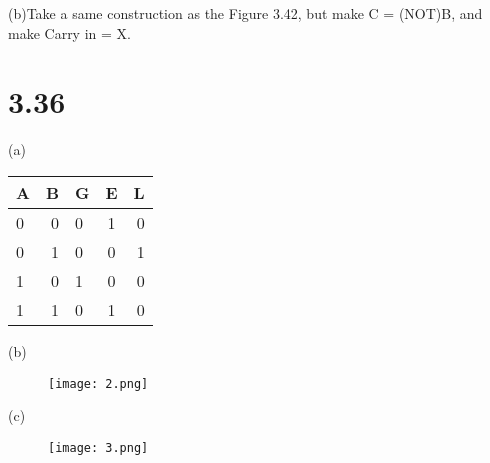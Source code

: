 \documentclass[20pt]{ctexart}
\begin{document}
(b)Take a same construction as the Figure 3.42, but make C = (NOT)B, and make Carry in = X.

\section*{3.36}
(a)\begin{table}[H]
    \centering
    \begin{tabular}{lr|lcr}
    \hline
    A & B & G & E & L \\
    \hline
    0 & 0 & 0 & 1 & 0 \\
    0 & 1 & 0 & 0 & 1 \\
    1 & 0 & 1 & 0 & 0 \\
    1 & 1 & 0 & 1 & 0 \\
    \hline
    \end{tabular}
    \end{table}

(b) \begin{figure}[H]
    \centering
    \texttt{[image: 2.png]}
  \end{figure}

(c) \begin{figure}[H]
    \centering
    \texttt{[image: 3.png]}
  \end{figure}


\end{document}
